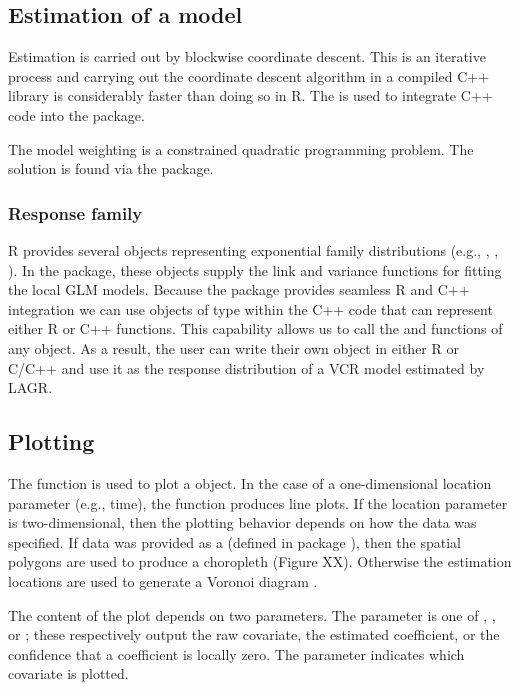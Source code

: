 \subsection{Estimation of a model}
Estimation is carried out by blockwise coordinate descent. This is an iterative process and carrying out the coordinate descent algorithm in a compiled C++ library is considerably faster than doing so in R. The  is used to integrate C++ code into the  package.

The model weighting is a constrained quadratic programming problem. The solution is found via the  package.

\subsubsection{Response family}
R provides several  objects representing exponential family distributions (e.g., , , ). In the  package, these objects supply the link and variance functions for fitting the local GLM models. Because the  package provides seamless R and C++ integration we can use objects of type  within the C++ code that can represent either R or C++ functions. This capability allows us to call the  and  functions of any  object. As a result, the user can write their own  object in either R or C/C++ and use it as the response distribution of a VCR model estimated by LAGR.

\subsection{Plotting}
The function  is used to plot a  object. In the case of a one-dimensional location parameter (e.g., time), the function produces line plots. If the location parameter is two-dimensional, then the plotting behavior depends on how the data was specified. If data was provided as a  (defined in package ), then the spatial polygons are used to produce a choropleth (Figure XX). Otherwise the estimation locations are used to generate a Voronoi diagram \citep{voronoi}.

The content of the plot depends on two parameters. The parameter  is one of , , or ; these respectively output the raw covariate, the estimated coefficient, or the confidence that a coefficient is locally zero. The parameter  indicates which covariate is plotted.

